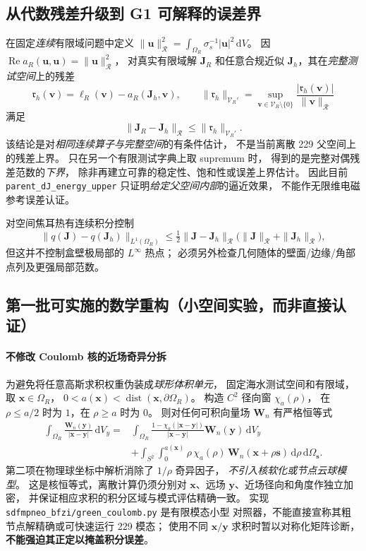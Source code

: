 \subsection{从代数残差升级到 G1 可解释的误差界}
在固定\emph{连续}有限域问题中定义
\(\|\bm u\|_{\mathcal R}^2=
\int_{\Omega_R}\sigma_s^{-1}|\bm u|^2\,\mathrm dV\)。
因 \(\operatorname{Re}a_R(\bm u,\bm u)
=\|\bm u\|_{\mathcal R}^2\)，
对真实有限域解 \(\bm J_R\) 和任意合规近似
\(\bm J_h\)，其在\emph{完整测试空间}上的残差
\[
\mathfrak r_h(\bm v)
=\ell_R(\bm v)-a_R(\bm J_h,\bm v),\qquad
\|\mathfrak r_h\|_{\mathcal V_R'}
=\sup_{\bm v\in\mathcal V_R\setminus\{0\}}
\frac{|\mathfrak r_h(\bm v)|}{\|\bm v\|_{\mathcal R}}
\]
满足
\begin{equation}
\boxed{\|\bm J_R-\bm J_h\|_{\mathcal R}
\leq\|\mathfrak r_h\|_{\mathcal V_R'}.}
\label{eq:g1-residual-continuum}
\end{equation}
该结论是对\emph{相同连续算子与完整空间}的有条件估计，
不是当前离散 229 父空间上的残差上界。
只在另一个有限测试字典上取 supremum 时，
得到的是完整对偶残差范数的\emph{下界}，
除非再建立可靠的稳定性、饱和性或误差上界估计。
因此目前 \texttt{parent\_dJ\_energy\_upper}
只证明\emph{给定父空间内部}的逼近效果，
不能作无限维电磁参考误差认证。

对空间焦耳热有连续积分控制
\[
\|q(\bm J)-q(\bm J_h)\|_{L^1(\Omega_R)}
\leq\tfrac12\|\bm J-\bm J_h\|_{\mathcal R}
\big(\|\bm J\|_{\mathcal R}+\|\bm J_h\|_{\mathcal R}\big),
\]
但这并不控制盒壁极局部的 \(L^\infty\) 热点；
必须另外检查几何随体的壁面/边缘/角部点列及更强局部范数。

\subsection{第一批可实施的数学重构（小空间实验，而非直接认证）}
\paragraph{不修改 Coulomb 核的近场奇异分拆}
为避免将任意高斯求积权重伪装成\emph{球形体积单元}，
固定海水测试空间和有限域，取
\(\bm x\in\Omega_R\)，
\(0<a(\bm x)<\operatorname{dist}(\bm x,\partial\Omega_R)\)。
构造 \(C^2\) 径向窗 \(\chi_a(\rho)\)，
在 \(\rho\le a/2\) 时为 \(1\)，在 \(\rho\ge a\) 时为 \(0\)。
则对任何可积向量场 \(\bm W_n\) 有严格恒等式
\begin{align}
\int_{\Omega_R}\frac{\bm W_n(\bm y)}{|\bm x-\bm y|}\,\mathrm dV_y
={}&\int_{\Omega_R}
\frac{1-\chi_a(|\bm x-\bm y|)}
{|\bm x-\bm y|}\bm W_n(\bm y)\,\mathrm dV_y
\nonumber\\
&+\int_{S^2}\int_0^{a(\bm x)}
\rho\,\chi_a(\rho)\,
\bm W_n(\bm x+\rho\bm s)\,\mathrm d\rho\,\mathrm d\Omega_{\bm s}.
\label{eq:g1-coulomb-exact-split}
\end{align}
第二项在物理球坐标中解析消除了 \(1/\rho\) 奇异因子，
\emph{不引入核软化或节点云球模型}。
这是核恒等式，离散计算仍须分别对
\(\bm x\)、远场 \(\bm y\)、近场径向和角度作独立加密，
并保证相应求积的积分区域与模式评估精确一致。
实现 \texttt{sdfmpneo\_bfzi/green\_coulomb.py} 是有限模态小型
对照器，不能直接宣称其粗节点解精确或可快速运行 229 模态；
使用不同 \(\bm x/\bm y\) 求积时暂以对称化矩阵诊断，
\textbf{不能强迫其正定以掩盖积分误差}。

